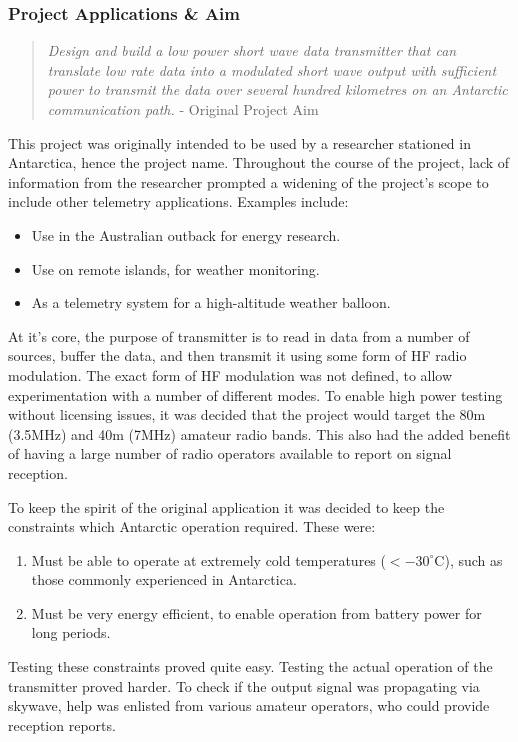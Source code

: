 \documentclass[a4paper,12pt]{article}
\begin{document}
\subsubsection*{Project Applications \& Aim}


\begin{quote}
\textit{
Design and build a low power short wave data transmitter that can translate low rate data into a modulated short wave output with sufficient power to transmit the data over several hundred kilometres on an Antarctic communication path.}
- Original Project Aim
\end{quote}


This project was originally intended to be used by a researcher stationed in Antarctica, hence the project name. Throughout the course of the project, lack of information from the researcher prompted a widening of the project's scope to include other telemetry applications. Examples include:
\begin{itemize}
\item Use in the Australian outback for energy research.
\item Use on remote islands, for weather monitoring.
\item As a telemetry system for a high-altitude weather balloon. 
\end{itemize}

At it's core, the purpose of transmitter is to read in data from a number of sources, buffer the data, and then transmit it using some form of HF radio modulation. The exact form of HF modulation was not defined, to allow experimentation with a number of different modes. To enable high power testing without licensing issues, it was decided that the project would target the 80m (3.5MHz) and 40m (7MHz) amateur radio bands. This also had the added benefit of having a large number of radio operators available to report on signal reception.

To keep the spirit of the original application it was decided to keep the constraints which Antarctic operation required. These were:
\begin{enumerate}
\item Must be able to operate at extremely cold temperatures ($<-30^\circ$C), such as those commonly experienced in Antarctica.
\item Must be very energy efficient, to enable operation from battery power for long periods.
\end{enumerate}

Testing these constraints proved quite easy. Testing the actual operation of the transmitter proved harder. To check if the output signal was propagating via skywave, help was enlisted from various amateur operators, who could provide reception reports. 
\end{document}
